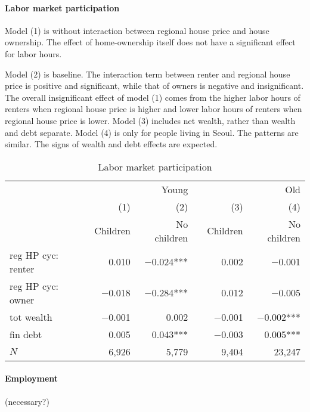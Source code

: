\documentclass[10pt]{article}
\theoremstyle{definition}
\theoremstyle{remark}
\begin{document}
\paragraph{Labor market participation} Model (1) is without interaction between regional house price and house ownership. The effect of home-ownership itself does not have a significant effect for labor hours.

Model (2) is baseline. The interaction term between renter and regional house price is positive and significant, while that of owners is negative and insignificant. The overall insignificant effect of model (1) comes from the higher labor hours of renters when regional house price is higher and lower labor hours of renters when regional house price is lower. Model (3) includes net wealth, rather than wealth and debt separate. Model (4) is only for people living in Seoul. The patterns are similar. The signs of wealth and debt effects are expected. 

\begin{table}[pt]
    \centering
    \caption{Labor market participation}
    \label{tab:lm_part}
    \begin{tabular}{lrrlrr}
        \toprule
        & \multicolumn{2}{r}{Young} &  & \multicolumn{2}{r}{Old} \\
        \cmidrule{2-3} \cmidrule{5-6} 
        & (1) & (2) &  & (3) & (4) \\
        & Children & No children &  & Children & No children \\
        \midrule
        reg HP cyc: renter & 0.010\phantom{***} & $-$0.024*** &  & 0.002\phantom{***} & $-$0.001\phantom{***} \\
        reg HP cyc: owner & $-$0.018\phantom{***} & $-$0.284*** &  & 0.012\phantom{***} & $-$0.005\phantom{***} \\
        tot wealth & $-$0.001\phantom{***} & 0.002\phantom{***} &  & $-$0.001\phantom{***} & $-$0.002*** \\
        fin debt & 0.005\phantom{***} & 0.043*** &  & $-$0.003\phantom{***} & 0.005*** \\
        \midrule
        $N$ & 6,926\phantom{***} & 5,779\phantom{***} &  & 9,404\phantom{***} & 23,247\phantom{***} \\
        \bottomrule
    \end{tabular}
\end{table}

\paragraph{Employment} (necessary?)
\end{document}
